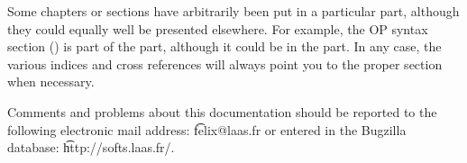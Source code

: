 Some chapters or sections have arbitrarily been put in a particular
part, although they could equally well be presented elsewhere.
For example, the OP syntax section () is
part of the \CPK{} part, although it could be in the \OPE{} part. In
any case, the various indices and cross references will always point
you to the proper section when necessary.

Comments and problems about this documentation should be reported to the
following electronic mail address: \t{felix@laas.fr} or entered in the
Bugzilla database: \t{http://softs.laas.fr/}.



